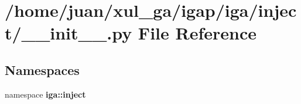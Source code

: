 \section{/home/juan/xul\_\-ga/igap/iga/inject/\_\-\_\-init\_\-\_\-.py File Reference}
\label{iga_2inject_2____init_____8py}
\subsection*{Namespaces}
\begin{CompactItemize}
\item 
namespace {\bf iga::inject}
\end{CompactItemize}
